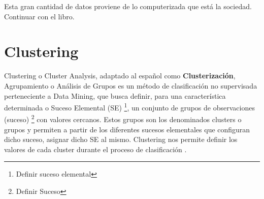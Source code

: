 \documentclass[3p,twocolumn]{elsarticle}
\begin{document}
Esta gran cantidad de datos proviene de lo computerizada que está la sociedad. Continuar con el libro.




\clearpage
\section{Clustering} 



Clustering o Cluster Analysis, adaptado al español como \textbf{Clusterización}, Agrupamiento o Análisis de Grupos es un método de clasificación no supervisada perteneciente a Data Mining, que busca definir, para una característica determinada o Suceso Elemental (SE) \footnote{Definir suceso elemental}, un conjunto de grupos de observaciones (suceso) \footnote{Definir Suceso} con valores cercanos. Estos grupos son los denominados clusters o grupos y permiten a partir de los diferentes sucesos elementales que configuran dicho suceso, asignar dicho SE al mismo. Clustering nos permite definir los valores de cada cluster durante el proceso de clasificación \cite{cita5}.


\newpage
\end{document}
